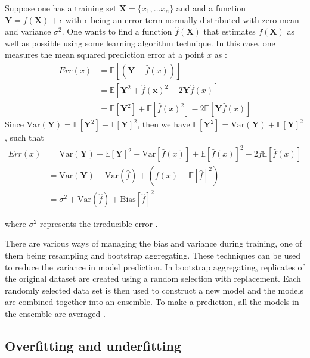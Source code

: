 Suppose  one has a training set $\textbf{X}=\{x_1,\dots x_n\}$ and and a function $\textbf{Y}=f(\textbf{X})+\epsilon$ with $\epsilon$ being an error term normally distributed with zero mean and variance $\sigma^2$. One wants to find a function $\widehat{f}(\textbf{X})$  that estimates $f(\textbf{X})$ as well as possible using some learning algorithm technique. In this case, one measures the mean squared prediction error at a point $x$ as :
\begin{align*}
Err(x)&= \mathbb{E}\left[(\textbf{Y}- \widehat{f}(x) ) \right]\\
&= \mathbb{E}\left[ \textbf{Y}^2 +\widehat{f}(\textbf{x})^2 -2\textbf{Y}\widehat{f}(x)\right]\\
&= \mathbb{E}\left[\textbf{Y}^2 \right] + \mathbb{E}\left[\widehat{f}(x)^2 \right]- 2\mathbb{E}\left[\textbf{Y}\widehat{f}(x)\right]
\end{align*}
Since $\text{Var}(\textbf{Y}) = \mathbb{E}\left[\textbf{Y}^2 \right]- \mathbb{E}\left[\textbf{Y}\right]^2$, then we have  $\mathbb{E}\left[\textbf{Y}^2 \right] =\text{Var}(\textbf{Y}) + \mathbb{E}\left[\textbf{Y}\right]^2$, such that
\begin{align*}
Err(x)&= \text{Var}(\textbf{Y}) + \mathbb{E}\left[\textbf{Y}\right]^2 + \text{Var}\left[\widehat{f}(x)\right] + \mathbb{E}\left[\widehat{f}(x) \right]^2- 2f\mathbb{E}\left[\widehat{f}(x) \right]\\
&= \text{Var}(\textbf{Y}) + \text{Var}(\widehat{f}) + (f(x)- \mathbb{E}\left[
\widehat{f}\right]^2)\\
&= \sigma^2 + \text{Var}(\widehat{f})+ \text{Bias}\left[\widehat{f}\right]^2
\end{align*}

where $\sigma^2$ represents the irreducible error \citep{fortmann2012understanding}. 

There are various ways of managing the bias and variance during training, one of them being resampling and bootstrap aggregating. These techniques can be used to reduce the variance in model prediction. In bootstrap aggregating, replicates of the original dataset are created using a random selection with replacement. Each randomly selected data set is then used to construct a new model and the models are combined together into an ensemble. To make a prediction, all the models in the ensemble are averaged \citep{fortmann2012understanding}.

\subsection{Overfitting and underfitting}

